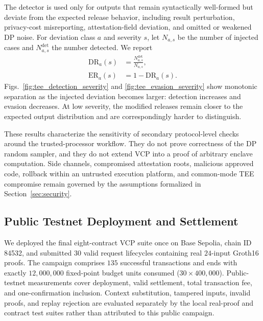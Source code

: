 \documentclass[10pt,journal,compsoc]{IEEEtran}
\begin{document}
The detector is used only for outputs that remain syntactically well-formed but deviate from the expected release behavior, including result perturbation, privacy-cost misreporting, attestation-field deviation, and omitted or weakened DP noise. For deviation class $a$ and severity $s$, let $N_{a,s}$ be the number of injected cases and $N_{a,s}^{\mathrm{det}}$ the number detected. We report
\begin{equation}
\begin{aligned}
\mathrm{DR}_{a}(s)
&=
\frac{N_{a,s}^{\mathrm{det}}}{N_{a,s}},
\\
\mathrm{ER}_{a}(s)
&=
1-\mathrm{DR}_{a}(s).
\end{aligned}
\label{eq:deviation_detection_metrics}
\end{equation}
Figs.~\ref{fig:tee_detection_severity} and \ref{fig:tee_evasion_severity} show monotonic separation as the injected deviation becomes larger: detection increases and evasion decreases. At low severity, the modified releases remain closer to the expected output distribution and are correspondingly harder to distinguish.

These results characterize the sensitivity of secondary protocol-level checks around the trusted-processor workflow. They do not prove correctness of the DP random sampler, and they do not extend VCP into a proof of arbitrary enclave computation. Side channels, compromised attestation roots, malicious approved code, rollback within an untrusted execution platform, and common-mode TEE compromise remain governed by the assumptions formalized in Section~\ref{sec:security}.

\subsection{Public Testnet Deployment and Settlement}
\label{subsec:public_testnet}

We deployed the final eight-contract VCP suite once on Base Sepolia, chain ID 84532, and submitted $30$ valid request lifecycles containing real $24$-input Groth16 proofs. The campaign comprises $135$ successful transactions and ends with exactly $12{,}000{,}000$ fixed-point budget units consumed ($30\times400{,}000$). Public-testnet measurements cover deployment, valid settlement, total transaction fee, and one-confirmation inclusion. Context substitution, tampered inputs, invalid proofs, and replay rejection are evaluated separately by the local real-proof and contract test suites rather than attributed to this public campaign.
\end{document}
